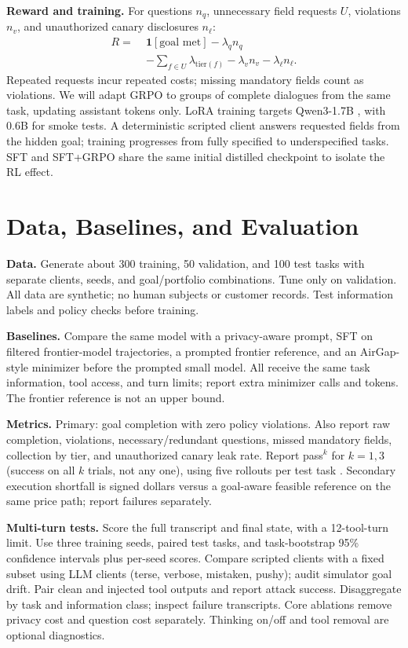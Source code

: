 \documentclass[11pt]{article}
\begin{document}
\textbf{Reward and training.} For questions $n_q$, unnecessary field requests $U$, violations $n_v$, and unauthorized canary disclosures $n_\ell$:
\begin{align*}
R =\;&\mathbf{1}[\text{goal met}] - \lambda_q n_q \\
&-\textstyle\sum_{f\in U}\lambda_{\mathrm{tier}(f)}-\lambda_v n_v-\lambda_\ell n_\ell.
\end{align*}
Repeated requests incur repeated costs; missing mandatory fields count as violations. We will adapt GRPO \citep{shao-2024-deepseekmath} to groups of complete dialogues from the same task, updating assistant tokens only. LoRA training targets Qwen3-1.7B \citep{qwen3-model}, with 0.6B for smoke tests. A deterministic scripted client answers requested fields from the hidden goal; training progresses from fully specified to underspecified tasks. SFT and SFT+GRPO share the same initial distilled checkpoint to isolate the RL effect.

\section{Data, Baselines, and Evaluation}
\textbf{Data.} Generate about 300 training, 50 validation, and 100 test tasks with separate clients, seeds, and goal/portfolio combinations. Tune only on validation. All data are synthetic; no human subjects or customer records. Test information labels and policy checks before training.

\textbf{Baselines.} Compare the same model with a privacy-aware prompt, SFT on filtered frontier-model trajectories, a prompted frontier reference, and an AirGap-style minimizer before the prompted small model. All receive the same task information, tool access, and turn limits; report extra minimizer calls and tokens. The frontier reference is not an upper bound.

\textbf{Metrics.} Primary: goal completion with zero policy violations. Also report raw completion, violations, necessary/redundant questions, missed mandatory fields, collection by tier, and unauthorized canary leak rate. Report pass$^{k}$ for $k=1,3$ (success on all $k$ trials, not any one), using five rollouts per test task \citep{yao-2025-taubench}. Secondary execution shortfall is signed dollars versus a goal-aware feasible reference on the same price path; report failures separately.

\textbf{Multi-turn tests.} Score the full transcript and final state, with a 12-tool-turn limit. Use three training seeds, paired test tasks, and task-bootstrap 95\% confidence intervals plus per-seed scores. Compare scripted clients with a fixed subset using LLM clients (terse, verbose, mistaken, pushy); audit simulator goal drift. Pair clean and injected tool outputs and report attack success. Disaggregate by task and information class; inspect failure transcripts. Core ablations remove privacy cost and question cost separately. Thinking on/off and tool removal are optional diagnostics.
\end{document}
